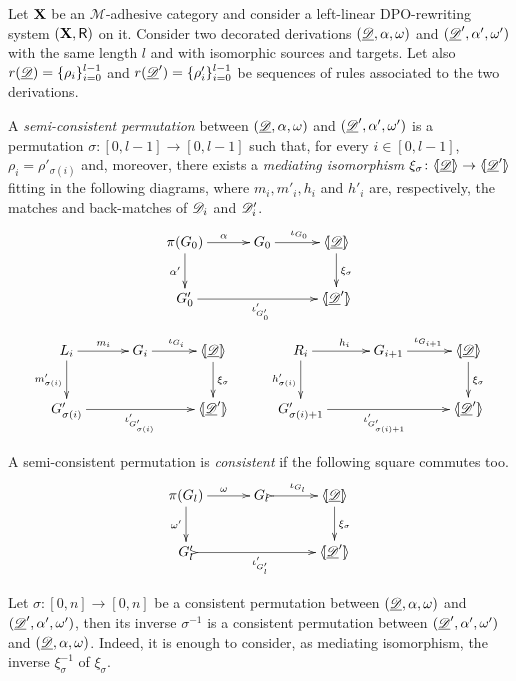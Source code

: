\begin{definition}\label{def:permcon}
	Let $\textbf {\textup{X}}$ be an $\mathcal{M}$-adhesive category and consider a left-linear DPO-rewriting system $(\textbf {\textup{X}}, \mathsf{R})$ on it.  Consider two decorated derivations $(\underline{\mathscr{D}}, \alpha, \omega)$ and  $(\underline{\mathscr{D}}', \alpha', \omega')$ with the same length $l$ and with isomorphic sources and targets. Let also $r(\underline{\mathscr{D}})=\{\rho_i\}_{i=0}^{l-1}$ and $r(\underline{\mathscr{D}}')=\{\rho'_i\}_{i=0}^{l-1}$	be sequences of rules associated to the two derivations.
	
	A \emph{semi-consistent permutation} between  $(\underline{\mathscr{D}}, \alpha, \omega)$ and $(\underline{\mathscr{D}}', \alpha', \omega')$ is a permutation $\sigma\colon [0,l-1]\to [0,l-1]$  such that, for every $i\in [0,l-1]$, $\rho_i=\rho'_{\sigma(i)}$ and, moreover, there exists a \emph{mediating isomorphism} $\xi_\sigma\colon \langle \hspace{-1.85pt}[ \underline{\mathscr{D}}]\hspace{-1.85pt}\rangle \to \langle \hspace{-1.85pt}[ \underline{\mathscr{D}}' ]\hspace{-1.85pt}\rangle$ fitting in the following diagrams, where $m_i, m'_i, h_i$ and $h'_i$ are, respectively, the matches and back-matches of $\mathscr{D}_i$ and $\mathscr{D}'_i$.
	\[\xymatrix@C=30pt{\pi(G_0)\ar[r]^{\alpha} \ar[d]_{\alpha'} & G_0 \ar[r]^{\iota_{G_0}} &\tpro{D} \ar[d]^{\xi_\sigma}\\ G'_0 \ar[rr]_{\iota'_{G'_0}} & &\lpro \der{D}' \rpro}\]
	\[\xymatrix@C=30pt{L_i \ar[r]^{m_i} \ar[d]_{m'_{\sigma(i)}}& G_i \ar[r]^{\iota_{G_i}} &\tpro{D} \ar[d]^{\xi_\sigma} & R_i \ar[r]^{h_i} \ar[d]_{h'_{\sigma(i)}}& G_{i+1} \ar[r]^{\iota_{G_{i+1}}} &\tpro{D} \ar[d]^{\xi_\sigma} \\G'_{\sigma(i)} \ar[rr]_{\iota'_{G'_{\sigma(i)}}}&& \lpro \der{D}' \rpro& G'_{\sigma(i)+1} \ar[rr]_{\iota'_{G'_{\sigma(i)+1}}}&& \lpro \der{D}' \rpro}\]
	
	A semi-consistent permutation is \emph{consistent} if the following square commutes too.
	\[\xymatrix@C=30pt{ \pi(G_{l}) \ar[r]^{\omega} \ar[d]_{\omega'} & G_{l} \ar@{>->}[r]^{\iota_{G_{l}}} &\tpro{D} \ar[d]^{\xi_\sigma} \\  G'_{l} \ar@{>->}[rr]_{\iota'_{G'_{l}}} & &\lpro \der{D}' \rpro}\]
\end{definition}

\begin{remark}\label{rem:inversa}
	Let $\sigma\colon [0,n]\to [0,n]$ be a consistent permutation between $(\underline{\mathscr{D}},\alpha, \omega)$ and $(\underline{\mathscr{D}}', \alpha', \omega')$, then its inverse $\sigma^{-1}$ is a consistent permutation between $(\underline{\mathscr{D}}', \alpha', \omega')$ and $(\underline{\mathscr{D}},\alpha, \omega)$. Indeed, it is enough to consider, as mediating isomorphism, the inverse $\xi^{-1}_\sigma$ of $\xi_\sigma$.
\end{remark}

